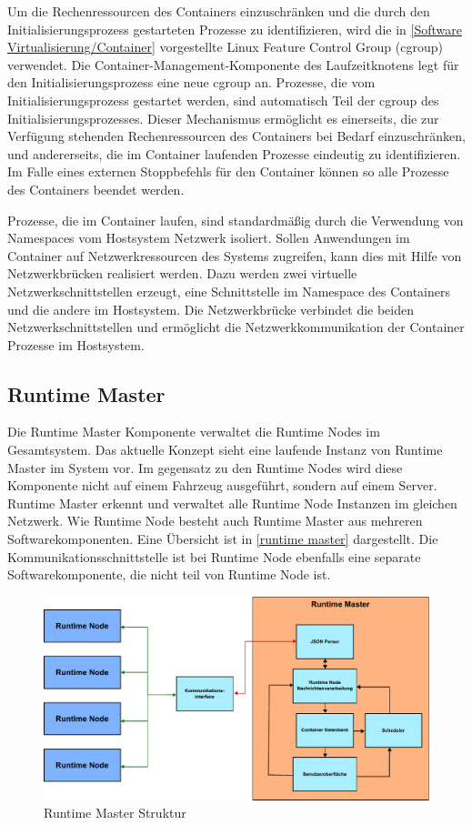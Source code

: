 Um die Rechenressourcen des Containers einzuschränken und die durch den Initialisierungsprozess gestarteten Prozesse zu identifizieren, wird die in \autoref{Software Virtualisierung/Container} vorgestellte Linux Feature Control Group (cgroup) verwendet. Die Container-Management-Komponente des Laufzeitknotens legt für den Initialisierungsprozess eine neue cgroup an. Prozesse, die vom Initialisierungsprozess gestartet werden, sind automatisch Teil der cgroup des Initialisierungsprozesses. Dieser Mechanismus ermöglicht es einerseits, die zur Verfügung stehenden Rechenressourcen des Containers bei Bedarf einzuschränken, und andererseits, die im Container laufenden Prozesse eindeutig zu identifizieren. Im Falle eines externen Stoppbefehls für den Container können so alle Prozesse des Containers beendet werden.

Prozesse, die im Container laufen, sind standardmäßig durch die Verwendung von Namespaces vom Hostsystem Netzwerk isoliert. Sollen Anwendungen im Container auf Netzwerkressourcen des Systems zugreifen, kann dies mit Hilfe von Netzwerkbrücken realisiert werden. Dazu werden zwei virtuelle Netzwerkschnittstellen erzeugt, eine Schnittstelle im Namespace des Containers und die andere im Hostsystem. Die Netzwerkbrücke verbindet die beiden Netzwerkschnittstellen und ermöglicht die Netzwerkkommunikation der Container Prozesse im Hostsystem. 

\subsection{Runtime Master}

Die Runtime Master Komponente verwaltet die Runtime Nodes im Gesamtsystem. Das aktuelle Konzept sieht eine laufende Instanz von Runtime Master im System vor. Im gegensatz zu den Runtime Nodes wird diese Komponente nicht auf einem Fahrzeug ausgeführt, sondern auf einem Server. Runtime Master erkennt und verwaltet alle Runtime Node Instanzen im gleichen Netzwerk. Wie Runtime Node besteht auch Runtime Master aus mehreren Softwarekomponenten. Eine Übersicht ist in \autoref{runtime master} dargestellt. Die Kommunikationsschnittstelle ist bei Runtime Node ebenfalls eine separate Softwarekomponente, die nicht teil von Runtime Node ist. 

\begin{figure}[htbp]
	\centering
	\includegraphics[width=\textwidth]{./content/graphics/Runtime_Master_Arch.pdf}
	\caption{Runtime Master Struktur}
	\label{runtime master}
\end{figure}


